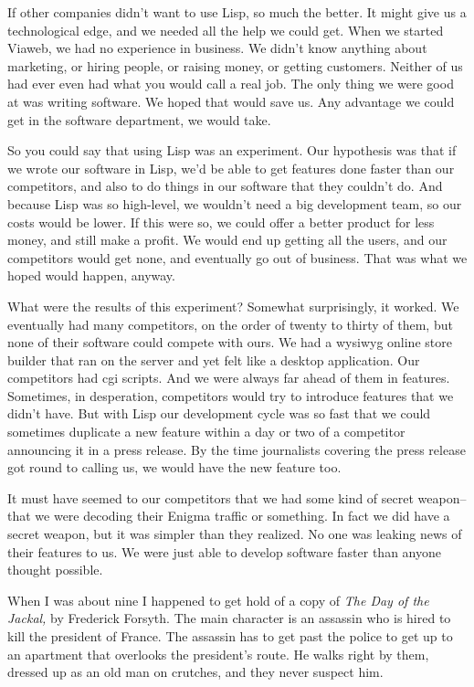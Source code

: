 \documentclass[12pt]{book}
\begin{document}
If other companies didn't want to use Lisp, so much the better. It might
give us a technological edge, and we needed all the help we could get.
When we started Viaweb, we had no experience in business. We didn't know
anything about marketing, or hiring people, or raising money, or getting
customers. Neither of us had ever even had what you would call a real
job. The only thing we were good at was writing software. We hoped that
would save us. Any advantage we could get in the software department, we
would take.

So you could say that using Lisp was an experiment. Our hypothesis was
that if we wrote our software in Lisp, we'd be able to get features done
faster than our competitors, and also to do things in our software that
they couldn't do. And because Lisp was so high-level, we wouldn't need a
big development team, so our costs would be lower. If this were so, we
could offer a better product for less money, and still make a profit. We
would end up getting all the users, and our competitors would get none,
and eventually go out of business. That was what we hoped would happen,
anyway.

What were the results of this experiment? Somewhat surprisingly, it
worked. We eventually had many competitors, on the order of twenty to
thirty of them, but none of their software could compete with ours. We
had a wysiwyg online store builder that ran on the server and yet felt
like a desktop application. Our competitors had cgi scripts. And we were
always far ahead of them in features. Sometimes, in desperation,
competitors would try to introduce features that we didn't have. But
with Lisp our development cycle was so fast that we could sometimes
duplicate a new feature within a day or two of a competitor announcing
it in a press release. By the time journalists covering the press
release got round to calling us, we would have the new feature too.

It must have seemed to our competitors that we had some kind of secret
weapon-- that we were decoding their Enigma traffic or something. In
fact we did have a secret weapon, but it was simpler than they realized.
No one was leaking news of their features to us. We were just able to
develop software faster than anyone thought possible.

When I was about nine I happened to get hold of a copy of \emph{The Day
of the Jackal,} by Frederick Forsyth. The main character is an assassin
who is hired to kill the president of France. The assassin has to get
past the police to get up to an apartment that overlooks the president's
route. He walks right by them, dressed up as an old man on crutches, and
they never suspect him.
\end{document}
